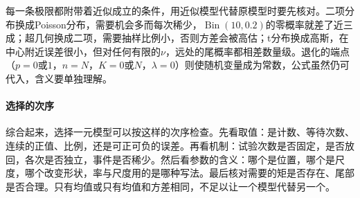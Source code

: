每一条极限都附带着近似成立的条件，用近似模型代替原模型时要先核对。二项分布换成Poisson分布，需要机会多而每次稀少，$\operatorname{Bin}(10,0.2)$的零概率就差了近三成；超几何换成二项，需要抽样比例小，否则方差会被高估；t分布换成高斯，在中心附近误差很小，但对任何有限的$\nu$，远处的尾概率都相差数量级。退化的端点（$p=0$或$1$，$n=N$，$K=0$或$N$，$\lambda=0$）则使随机变量成为常数，公式虽然仍可代入，含义要单独理解。

\paragraph{选择的次序}
综合起来，选择一元模型可以按这样的次序检查。先看取值：是计数、等待次数、连续的正值、比例，还是可正可负的误差。再看机制：试验次数是否固定，是否放回，各次是否独立，事件是否稀少。然后看参数的含义：哪个是位置，哪个是尺度，哪个改变形状，率与尺度用的是哪种写法。最后核对需要的矩是否存在、尾部是否合理。只有均值或只有均值和方差相同，不足以让一个模型代替另一个。
